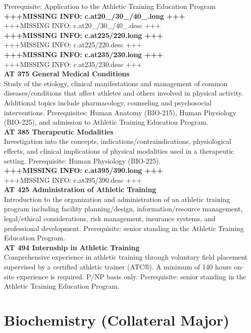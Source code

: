 \documentclass[
  letterpaper,
]{scrbook}
\begin{document}
Prerequisite: Application to the Athletic Training Education Program\\
\textbf{+++MISSING INFO: c.at20\_/30\_/40\_.long +++}\\
+++MISSING INFO: c.at20\_/30\_/40\_.desc +++\\
\textbf{+++MISSING INFO: c.at225/220.long +++}\\
+++MISSING INFO: c.at225/220.desc +++\\
\textbf{+++MISSING INFO: c.at235/230.long +++}\\
+++MISSING INFO: c.at235/230.desc +++\\
\textbf{AT 375 General Medical Conditions}\\
Study of the etiology, clinical manifestations and management of common
diseases/conditions that affect athletes and others involved in physical
activity. Additional topics include pharmacology, counseling and
psychosocial interventions. Prerequisites: Human Anatomy (BIO-215),
Human Physiology (BIO-225), and admission to Athletic Training Education
Program.\\
\textbf{AT 385 Therapeutic Modalities}\\
Investigation into the concepts, indications/contraindications,
physiological effects, and clinical implications of physical modalities
used in a therapeutic setting. Prerequisite: Human Physiology
(BIO-225).\\
\textbf{+++MISSING INFO: c.at395/390.long +++}\\
+++MISSING INFO: c.at395/390.desc +++\\
\textbf{AT 425 Administration of Athletic Training}\\
Introduction to the organization and administration of an athletic
training program including facility planning/design,
information/resource management, legal/ethical considerations, risk
management, insurance systems, and professional development.
Prerequisite: senior standing in the Athletic Training Education
Program.\\
\textbf{AT 494 Internship in Athletic Training}\\
Comprehensive experience in athletic training through voluntary field
placement supervised by a certified athletic trainer (ATC®). A minimum
of 140 hours on-site experience is required. P/NP basis only.
Prerequisite: senior standing in the Athletic Training Education
Program.

\section{Biochemistry (Collateral Major)}\label{sec-biochemistry}
\end{document}
